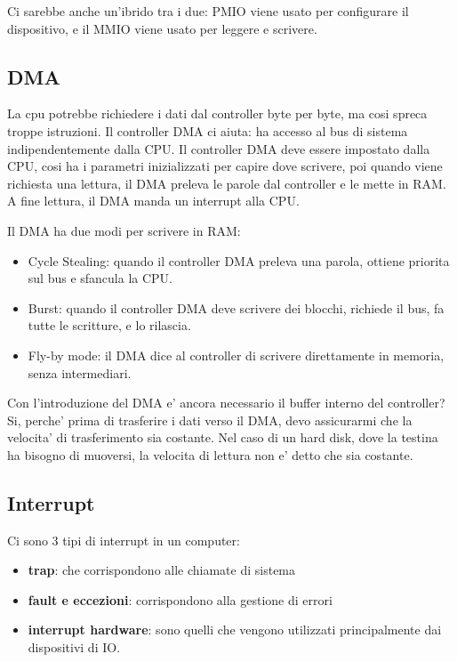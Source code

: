 Ci sarebbe anche un'ibrido tra i due: PMIO viene usato per configurare il dispositivo, e il MMIO viene usato per leggere e scrivere.

\subsection{DMA}
La cpu potrebbe richiedere i dati dal controller byte per byte, ma cosi spreca troppe istruzioni.
Il controller DMA ci aiuta: ha accesso al bus di sistema indipendentemente dalla CPU. Il controller DMA deve essere impostato dalla CPU, cosi
ha i parametri inizializzati per capire dove scrivere, poi quando viene richiesta una lettura, il DMA preleva le parole dal
controller e le mette in RAM. A fine lettura, il DMA manda un interrupt alla CPU.

Il DMA ha due modi per scrivere in RAM:
\begin{itemize}
    \item Cycle Stealing: quando il controller DMA preleva una parola, ottiene priorita sul bus e sfancula la CPU.
    \item Burst: quando il controller DMA deve scrivere dei blocchi, richiede il bus, fa tutte le scritture, e lo rilascia.
    \item Fly-by mode: il DMA dice al controller di scrivere direttamente in memoria, senza intermediari.
\end{itemize}

Con l'introduzione del DMA e' ancora necessario il buffer interno del controller? Si, perche'
prima di trasferire i dati verso il DMA, devo assicurarmi che la velocita' di trasferimento sia costante.
Nel caso di un hard disk, dove la testina ha bisogno di muoversi, la velocita di lettura non e' detto che sia costante.

\subsection{Interrupt}
Ci sono 3 tipi di interrupt in un computer:
\begin{itemize}
    \item \textbf{trap}: che corrispondono alle chiamate di sistema
    \item \textbf{fault e eccezioni}: corrispondono alla gestione di errori
    \item \textbf{interrupt hardware}: sono quelli che vengono utilizzati principalmente dai dispositivi di IO.
\end{itemize}

